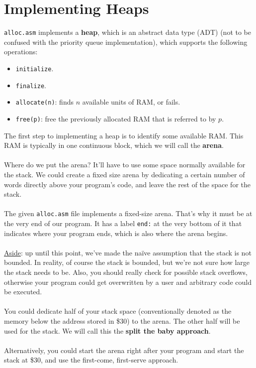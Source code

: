 \documentclass[]{article}
\theoremstyle{definition}
\begin{document}
	\section{Implementing Heaps}
		\verb+alloc.asm+ implements a \textbf{heap}, which is an abstract data type (ADT) (not to be confused with the priority queue implementation), which supports the following operations:
		\begin{itemize}
			\item \verb+initialize+.
			\item \verb+finalize+.
			\item \verb+allocate(n)+: finds $n$ available units of RAM, or fails.
			\item \verb+free(p)+: free the previously allocated RAM that is referred to by $p$.
		\end{itemize}

		The first step to implementing a heap is to identify some available RAM. This RAM is typically in one continuous block, which we will call the \textbf{arena}.
		\\ \\
		Where do we put the arena? It'll have to use some space normally available for the stack. We could create a fixed size arena by dedicating a certain number of words directly above your program's code, and leave the rest of the space for the stack. 
		\\ \\
		The given \verb+alloc.asm+ file implements a fixed-size arena. That's why it must be at the very end of our program. It has a label \verb+end:+ at the very bottom of it that indicates where your program ends, which is also where the arena begins.
		\\ \\
		\underline{Aside}: up until this point, we've made the na\"ive assumption that the stack is not bounded. In reality, of course the stack is bounded, but we're not sure how large the stack needs to be. Also, you should really check for possible stack overflows, otherwise your program could get overwritten by a user and arbitrary code could be executed.
		\\ \\
		You could dedicate half of your stack space (conventionally denoted as the memory below the address stored in \$30) to the arena. The other half will be used for the stack. We will call this the \textbf{split the baby approach}.
		\\ \\
		Alternatively, you could start the arena right after your program and start the stack at \$30, and use the first-come, first-serve approach.
\end{document}
